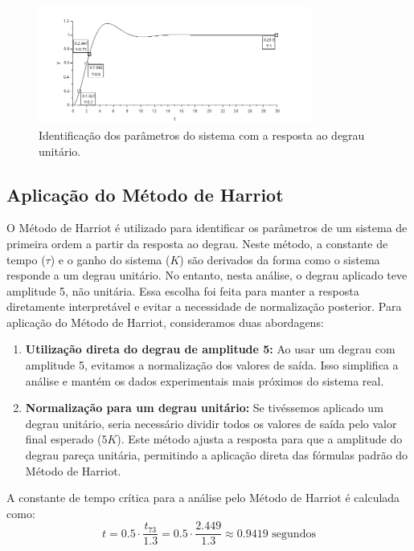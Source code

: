 \begin{figure}[h]
    \centering
    \includegraphics[width=0.8\textwidth]{atividades/10-atividade/assets/sistema-identificado-forcado-normalizado.png}
    \caption{Identificação dos parâmetros do sistema com a resposta ao degrau unitário.}
    \label{fig:sistema-identificado-forcado-normalizado}
\end{figure}


\subsection{Aplicação do Método de Harriot}

O Método de Harriot é utilizado para identificar os parâmetros de um sistema de primeira ordem a partir da resposta ao degrau. Neste método, a constante de tempo (\(\tau\)) e o ganho do sistema (\(K\)) são derivados da forma como o sistema responde a um degrau unitário. No entanto, nesta análise, o degrau aplicado teve amplitude 5, não unitária. Essa escolha foi feita para manter a resposta diretamente interpretável e evitar a necessidade de normalização posterior. Para aplicação do Método de Harriot, consideramos duas abordagens:

\begin{enumerate}
    \item \textbf{Utilização direta do degrau de amplitude 5:} Ao usar um degrau com amplitude 5, evitamos a normalização dos valores de saída. Isso simplifica a análise e mantém os dados experimentais mais próximos do sistema real.
    \item \textbf{Normalização para um degrau unitário:} Se tivéssemos aplicado um degrau unitário, seria necessário dividir todos os valores de saída pelo valor final esperado (\(5K\)). Este método ajusta a resposta para que a amplitude do degrau pareça unitária, permitindo a aplicação direta das fórmulas padrão do Método de Harriot.
\end{enumerate}

A constante de tempo crítica para a análise pelo Método de Harriot é calculada como:
\[
    t = 0.5 \cdot \frac{t_{73}}{1.3} = 0.5 \cdot \frac{2.449}{1.3} \approx 0.9419 \text{ segundos}
\]

